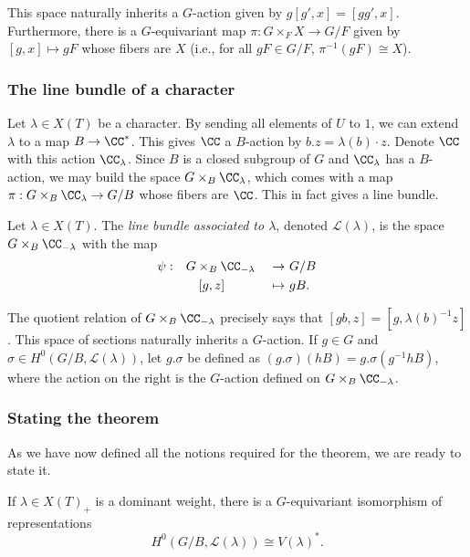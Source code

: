 This space naturally inherits a $G$-action given by $g [g', x] = [g g', x]$. Furthermore, there is a $G$-equivariant map $\pi: G \times_F X \to G/F$ given by $[g,x] \mapsto gF$ whose fibers are $X$ (i.e., for all $gF \in G/F$, $\pi^{-1}(gF) \cong X$).

\subsubsection{The line bundle of a character}
Let $\lambda \in X(T)$ be a character. By sending all elements of $U$ to $1$, we can extend $\lambda$ to a map $B \rightarrow \CC^*$. This gives $\CC$ a $B$-action by $b . z = \lambda(b) \cdot z$. Denote $\CC$ with this action $\CC_\lambda$. Since $B$ is a closed subgroup of $G$ and $\CC_\lambda$ has a $B$-action, we may build the space $G \times_B \CC_{\lambda}$, which comes with a map $\pi: G \times_B \CC_{\lambda} \to G/B$ whose fibers are $\CC$. This in fact gives a line bundle.
\begin{defn}
    Let $\lambda \in X(T)$. The \emph{line bundle associated to $\lambda$}, denoted $\mathcal{L}(\lambda)$, is the space $G \times_B \CC_{-\lambda}$ with the map
    \begin{alignat*}{4}
    \psi: \quad &G \times_B \CC_{-\lambda} &\ \to\ &G/B\\
           & \quad [g, z] &\ \mapsto\ &gB.
\end{alignat*}
\end{defn}

The quotient relation of $G \times_B \CC_{-\lambda}$ precisely says that $[g b, z] = [g, {\lambda(b)}^{-1} z]$.
This space of sections naturally inherits a $G$-action. If $g \in G$ and $\sigma \in H^{0}(G/B, \mathcal{L}(\lambda))$, let $g. \sigma$ be defined as $(g . \sigma) (h B) = g.\sigma(g^{-1}h B)$, where the action on the right is the $G$-action defined on $G \times_B \CC_{-\lambda}$. 

\subsubsection{Stating the theorem}
As we have now defined all the notions required for the theorem, we are ready to state it.

\begin{theorem}
    If $\lambda \in {X(T)}_+$ is a dominant weight, there is a $G$-equivariant isomorphism of representations
    \[ H^{0}(G/B, \mathcal{L}(\lambda)) \cong {V(\lambda)}^*. \]
\end{theorem}

